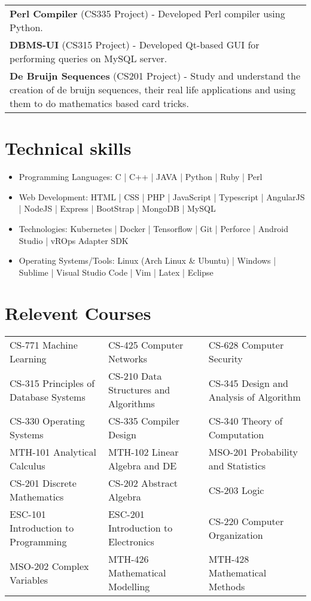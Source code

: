 \documentclass{article}
\begin{document}
\begin{tabularx}{\textwidth}{X}
	  \textbf{Perl Compiler} (CS335 Project) - Developed Perl compiler using Python.\\
	  \textbf{DBMS-UI} (CS315 Project) - Developed Qt-based GUI for performing queries on MySQL server.\\
	  \textbf{De Bruijn Sequences} (CS201 Project) - Study and understand the creation of de bruijn sequences, their real life
applications and using them to do mathematics based card tricks.
\end{tabularx}
\vspace{-4mm}

\section{Technical skills}
\begin{itemize}
	\setlength\itemsep{-0.5em}
	\item  Programming Languages: C | C++ | JAVA | Python | Ruby | Perl
	\item  Web Development: HTML | CSS | PHP | JavaScript | Typescript | AngularJS | NodeJS | Express | BootStrap | MongoDB | MySQL
	\item  Technologies: Kubernetes | Docker | Tensorflow | Git | Perforce | Android Studio | vROps Adapter SDK
	\item  Operating Systems/Tools: Linux (Arch Linux \& Ubuntu) | Windows | Sublime | Visual Studio Code | Vim | Latex | Eclipse
\end{itemize}
\vspace{-2mm}

\section{Relevent Courses}
\centering{}
\begin{tabular}{l|l|l}
CS-771 Machine Learning & CS-425 Computer Networks & CS-628 Computer Security \\
CS-315 Principles of Database Systems  & CS-210 Data Structures and Algorithms & CS-345 Design and Analysis of Algorithm\\
CS-330 Operating Systems & CS-335 Compiler Design & CS-340 Theory of Computation\\
MTH-101 Analytical Calculus & MTH-102 Linear Algebra and DE & MSO-201 Probability and Statistics \\
CS-201 Discrete Mathematics & CS-202 Abstract Algebra & CS-203 Logic \\
ESC-101 Introduction to Programming & ESC-201 Introduction to Electronics & CS-220 Computer Organization \\
MSO-202 Complex Variables & MTH-426 Mathematical Modelling & MTH-428 Mathematical Methods\\
\end{tabular}
\end{document}
